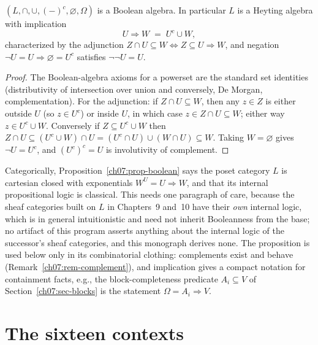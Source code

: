 \begin{proposition}\label{ch07:prop-boolean}
$(L,\cap,\cup,(-)^{c},\varnothing,\Omega)$ is a Boolean algebra. In particular $L$ is a Heyting algebra with implication
\[
U\Rightarrow W \;=\; U^{c}\cup W ,
\]
characterized by the adjunction $Z\cap U\subseteq W \iff Z\subseteq U\Rightarrow W$, and negation $\lnot U=U\Rightarrow\varnothing=U^{c}$ satisfies $\lnot\lnot U=U$.
\end{proposition}

\begin{proof}
The Boolean-algebra axioms for a powerset are the standard set identities (distributivity of intersection over union and conversely, De Morgan, complementation). For the adjunction: if $Z\cap U\subseteq W$, then any $z\in Z$ is either outside $U$ (so $z\in U^{c}$) or inside $U$, in which case $z\in Z\cap U\subseteq W$; either way $z\in U^{c}\cup W$. Conversely if $Z\subseteq U^{c}\cup W$ then $Z\cap U\subseteq (U^{c}\cup W)\cap U=(U^{c}\cap U)\cup(W\cap U)\subseteq W$. Taking $W=\varnothing$ gives $\lnot U=U^{c}$, and $(U^{c})^{c}=U$ is involutivity of complement.
\end{proof}

\begin{remark}\label{ch07:rem-heyting}
Categorically, Proposition~\ref{ch07:prop-boolean} says the poset category $L$ is cartesian closed with exponentials $W^{U}=U\Rightarrow W$, and that its internal propositional logic is classical. This needs one paragraph of care, because the sheaf categories built on $L$ in Chapters~9 and~10 have their \emph{own} internal logic, which is in general intuitionistic and need not inherit Booleanness from the base; no artifact of this program asserts anything about the internal logic of the successor's sheaf categories, and this monograph derives none. The proposition is used below only in its combinatorial clothing: complements exist and behave (Remark~\ref{ch07:rem-complement}), and implication gives a compact notation for containment facts, e.g., the block-completeness predicate $A_{i}\subseteq V$ of Section~\ref{ch07:sec-blocks} is the statement $\Omega= A_{i}\Rightarrow V$.
\end{remark}

\section{The sixteen contexts}\label{ch07:sec-sixteen}

